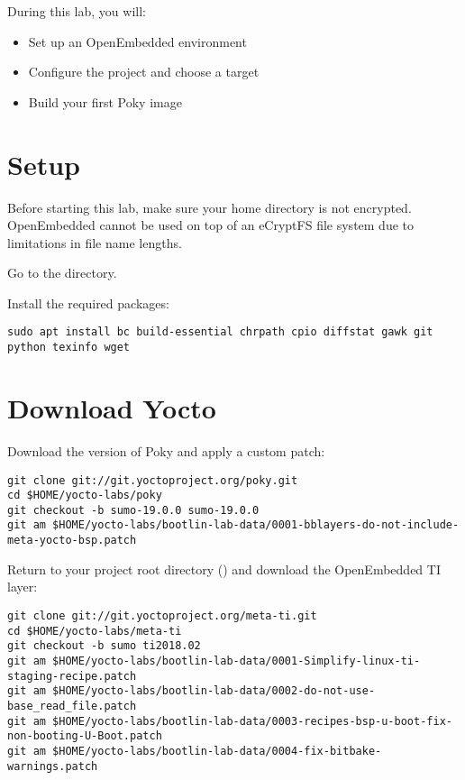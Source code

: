 
During this lab, you will:
\begin{itemize}
  \item Set up an OpenEmbedded environment
  \item Configure the project and choose a target
  \item Build your first Poky image
\end{itemize}

\section{Setup}

Before starting this lab, make sure your home directory is not
encrypted. OpenEmbedded cannot be used on top of an eCryptFS file
system due to limitations in file name lengths.

Go to the  directory.

Install the required packages:
\begin{verbatim}
sudo apt install bc build-essential chrpath cpio diffstat gawk git python texinfo wget
\end{verbatim}

\section{Download Yocto}

Download the  version of Poky and apply a custom patch:
\begin{verbatim}
git clone git://git.yoctoproject.org/poky.git
cd $HOME/yocto-labs/poky
git checkout -b sumo-19.0.0 sumo-19.0.0
git am $HOME/yocto-labs/bootlin-lab-data/0001-bblayers-do-not-include-meta-yocto-bsp.patch
\end{verbatim}

Return to your project root directory ()
and download the OpenEmbedded TI layer:
\begin{verbatim}
git clone git://git.yoctoproject.org/meta-ti.git
cd $HOME/yocto-labs/meta-ti
git checkout -b sumo ti2018.02
git am $HOME/yocto-labs/bootlin-lab-data/0001-Simplify-linux-ti-staging-recipe.patch
git am $HOME/yocto-labs/bootlin-lab-data/0002-do-not-use-base_read_file.patch
git am $HOME/yocto-labs/bootlin-lab-data/0003-recipes-bsp-u-boot-fix-non-booting-U-Boot.patch
git am $HOME/yocto-labs/bootlin-lab-data/0004-fix-bitbake-warnings.patch
\end{verbatim}

